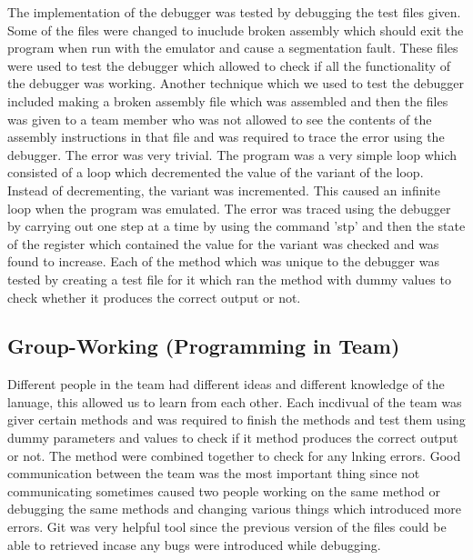 \documentclass[12pt,a4paper,oneside]{report}
\begin{document}
The implementation of the debugger was tested by debugging the test files given. Some of the files were changed to inuclude broken assembly which should exit the program when run with the emulator and cause a segmentation fault. These files were used to test the debugger which allowed to check if all the functionality of the debugger was working. Another technique which we used to test the debugger included making a broken assembly file which was assembled and then the files was given to a team member who was not allowed to see the contents of the assembly instructions in that file and was required to trace the error using the debugger. The error was very trivial. The program was a very simple loop which consisted of a loop which decremented the value of the variant of the loop. Instead of decrementing, the variant was incremented. This caused an infinite loop when the program was emulated. The error was traced using the debugger by carrying out one step at a time by using the command 'stp' and then the state of the register which contained the value for the variant was checked and was found to increase. Each of the method which was unique to the debugger was tested by creating a test file for it which ran the method with dummy values to check whether it produces the correct output or not.\\

\begin{center}
\section*{Group-Working (Programming in Team)}
\end{center}
Different people in the team had different ideas and different knowledge of the lanuage, this allowed us to learn from each other. Each incdivual of the team was giver certain methods and was required to finish  the methods and test them using dummy parameters and values to check if it method produces the correct output or not. The method were combined together to check for any lnking errors. Good communication between the team was the most important thing since not communicating sometimes caused two people working on the same method or debugging the same methods and changing various things which introduced more errors. Git was very helpful tool since the previous version of the files could be able to retrieved incase any bugs were introduced while debugging. 
\end{document}
